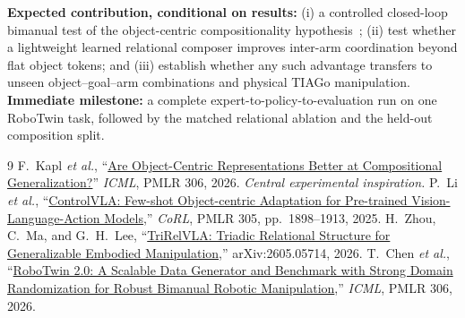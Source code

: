 \documentclass[11pt,a4paper]{article}
\begin{document}
\textbf{Expected contribution, conditional on results:} (i) a controlled closed-loop bimanual test of the object-centric compositionality hypothesis~\cite{kapl2026}; (ii) test whether a lightweight learned relational composer improves inter-arm coordination beyond flat object tokens; and (iii) establish whether any such advantage transfers to unseen object--goal--arm combinations and physical TIAGo manipulation. \textbf{Immediate milestone:} a complete expert-to-policy-to-evaluation run on one RoboTwin task, followed by the matched relational ablation and the held-out composition split.

\vspace{1pt}
{\footnotesize
\begin{thebibliography}{9}
\setlength{\itemsep}{0pt}
\setlength{\parsep}{0pt}
 F.~Kapl \emph{et al.}, ``\href{https://proceedings.mlr.press/v306/kapl26b.html}{Are Object-Centric Representations Better at Compositional Generalization?}'' \emph{ICML}, PMLR 306, 2026. \emph{Central experimental inspiration.}
 P.~Li \emph{et al.}, ``\href{https://proceedings.mlr.press/v305/li25c.html}{ControlVLA: Few-shot Object-centric Adaptation for Pre-trained Vision-Language-Action Models},'' \emph{CoRL}, PMLR 305, pp.~1898--1913, 2025.
 H.~Zhou, C.~Ma, and G.~H.~Lee, ``\href{https://arxiv.org/abs/2605.05714}{TriRelVLA: Triadic Relational Structure for Generalizable Embodied Manipulation},'' arXiv:2605.05714, 2026.
 T.~Chen \emph{et al.}, ``\href{https://proceedings.mlr.press/v306/chen26j.html}{RoboTwin 2.0: A Scalable Data Generator and Benchmark with Strong Domain Randomization for Robust Bimanual Robotic Manipulation},'' \emph{ICML}, PMLR 306, 2026.
\end{thebibliography}
}
\end{document}
